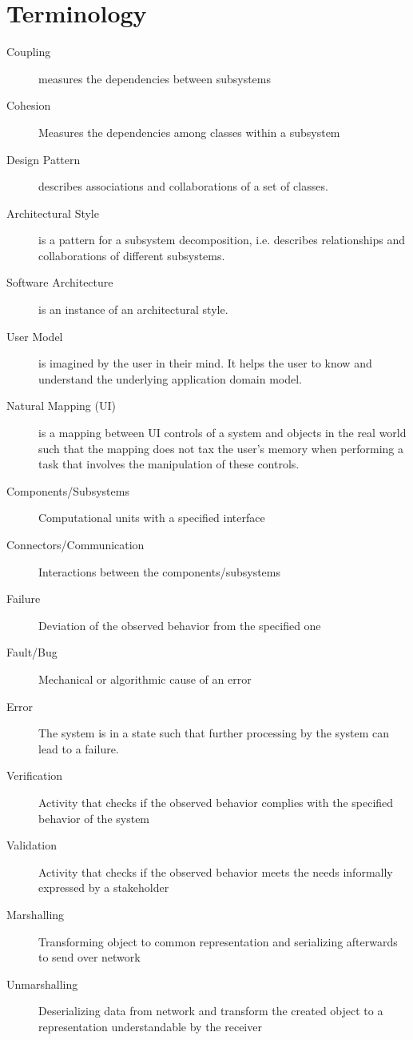 
\section{Terminology}
\begin{description}
  \item[Coupling] measures the dependencies between subsystems

  \item[Cohesion] Measures the dependencies among classes within a subsystem

  \item[Design Pattern] describes associations and collaborations of a set of classes.

  \item[Architectural Style] is a pattern for a subsystem decomposition, i.e. describes relationships and collaborations of different subsystems.

  \item[Software Architecture] is an instance of an architectural style.

  \item[User Model] is imagined by the user in their mind.
  It helps the user to know and understand the underlying application domain model.

  \item[Natural Mapping (UI)] is a mapping between UI controls of a system and objects in the real world such that the mapping does not tax the user's memory when performing a task that involves the manipulation of these controls.

  \item[Components/Subsystems] Computational units with a specified interface

  \item[Connectors/Communication] Interactions between the components/subsystems

  \item[Failure] Deviation of the observed behavior from the specified one

  \item[Fault/Bug] Mechanical or algorithmic cause of an error

  \item[Error] The system is in a state such that further processing by the system can lead to a failure.

  \item[Verification] Activity that checks if the observed behavior complies with the specified behavior of the system

  \item[Validation] Activity that checks if the observed behavior meets the needs informally expressed by a stakeholder
  
  \item[Marshalling] Transforming object to common representation and serializing afterwards to send over network
  
  \item[Unmarshalling] Deserializing data from network and transform the created object to a representation understandable by the receiver
  
\end{description}
